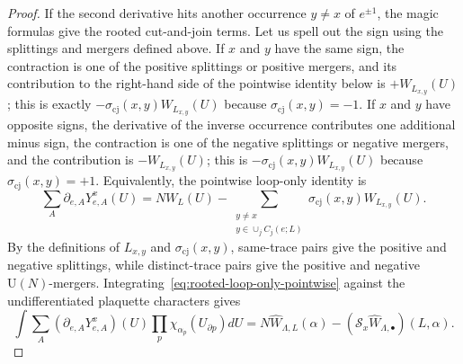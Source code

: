 \documentclass[11pt,a4paper,reqno]{amsart}
\theoremstyle{definition}
\theoremstyle{remark}
\newcommand\U{{\mathrm U}}
\begin{document}
\begin{proof}
If the second derivative hits another occurrence $y\neq x$ of $e^{\pm1}$, the magic formulas give the rooted cut-and-join terms.  Let us spell out the sign using the splittings and mergers defined above.  If $x$ and $y$ have the same sign, the contraction is one of the positive splittings or positive mergers, and its contribution to the right-hand side of the pointwise identity below is $+W_{L_{x,y}}(U)$; this is exactly $-\sigma_{\mathrm{cj}}(x,y)W_{L_{x,y}}(U)$ because $\sigma_{\mathrm{cj}}(x,y)=-1$.  If $x$ and $y$ have opposite signs, the derivative of the inverse occurrence contributes one additional minus sign, the contraction is one of the negative splittings or negative mergers, and the contribution is $-W_{L_{x,y}}(U)$; this is $-\sigma_{\mathrm{cj}}(x,y)W_{L_{x,y}}(U)$ because $\sigma_{\mathrm{cj}}(x,y)=+1$.  Equivalently, the pointwise loop-only identity is
\begin{equation}\label{eq:rooted-loop-only-pointwise}
\sum_A\partial_{e,A}Y^x_{e,A}(U)
=
N W_L(U)
-
\sum_{\substack{y\neq x\\ y\in\cup_j C_j(e;L)}}
\sigma_{\mathrm{cj}}(x,y) W_{L_{x,y}}(U).
\end{equation}
By the definitions of $L_{x,y}$ and $\sigma_{\mathrm{cj}}(x,y)$, same-trace pairs give the positive and negative splittings, while distinct-trace pairs give the positive and negative $\U(N)$-mergers.  Integrating~\eqref{eq:rooted-loop-only-pointwise} against the undifferentiated plaquette characters gives
\begin{equation}\label{eq:rooted-loop-only-integrated}
\int\sum_A(\partial_{e,A}Y^x_{e,A})(U)
\prod_p\chi_{\alpha_p}(U_{\partial p}) dU
=
N\widehat W_{\Lambda,L}(\alpha)
-
(\mathscr S_x\widehat W_{\Lambda,\bullet})(L,\alpha).
\end{equation}


\end{proof}
\end{document}
